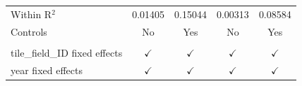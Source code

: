 \begin{table}[htbp]
\begin{tabular}{lcccc}
      Within R$^2$                    & 0.01405        & 0.15044        & 0.00313        & 0.08584\\  
      Controls                        & No             & Yes            & No             & Yes\\  
       \\
      tile\_field\_ID fixed effects   & $\checkmark$   & $\checkmark$   & $\checkmark$   & $\checkmark$\\   
      year fixed effects              & $\checkmark$   & $\checkmark$   & $\checkmark$   & $\checkmark$\\   
      \bottomrule
   \end{tabular}
\end{table}


